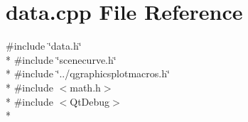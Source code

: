 \section{data.\+cpp File Reference}
\label{bk3_2curve_2data_8cpp}
{\ttfamily \#include \char`\"{}data.\+h\char`\"{}}\\*
{\ttfamily \#include \char`\"{}scenecurve.\+h\char`\"{}}\\*
{\ttfamily \#include \char`\"{}../qgraphicsplotmacros.\+h\char`\"{}}\\*
{\ttfamily \#include $<$math.\+h$>$}\\*
{\ttfamily \#include $<$Qt\+Debug$>$}\\*

